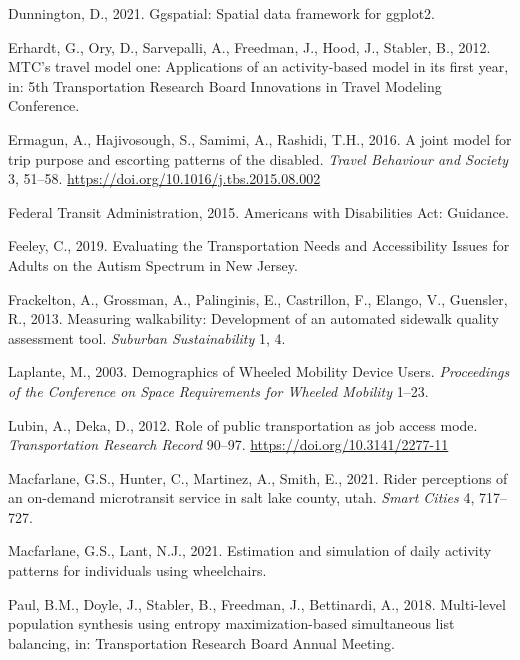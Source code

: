 \documentclass[3p, authoryear, review]{elsarticle} %
\newlength{\cslhangindent}
\newenvironment{CSLReferences}[2] %
 {%
  \setlength{\parindent}{0pt}
  \ifodd #1 \everypar{\setlength{\hangindent}{\cslhangindent}}\ignorespaces\fi
  \ifnum #2 > 0
  \setlength{\parskip}{#2\baselineskip}
  \fi
 }%
 {}
\begin{document}
\begin{CSLReferences}{1}{0}
\leavevmode{}%
Dunnington, D., 2021. Ggspatial: Spatial data framework for ggplot2.

\leavevmode{}%
Erhardt, G., Ory, D., Sarvepalli, A., Freedman, J., Hood, J., Stabler, B., 2012. MTC's travel model one: Applications of an activity-based model in its first year, in: 5th Transportation Research Board Innovations in Travel Modeling Conference.

\leavevmode{}%
Ermagun, A., Hajivosough, S., Samimi, A., Rashidi, T.H., 2016. {A joint model for trip purpose and escorting patterns of the disabled}. \emph{Travel Behaviour and Society} 3, 51--58. \url{https://doi.org/10.1016/j.tbs.2015.08.002}

\leavevmode{}%
Federal Transit Administration, 2015. {Americans with Disabilities Act: Guidance}.

\leavevmode{}%
Feeley, C., 2019. {Evaluating the Transportation Needs and Accessibility Issues for Adults on the Autism Spectrum in New Jersey}.

\leavevmode{}%
Frackelton, A., Grossman, A., Palinginis, E., Castrillon, F., Elango, V., Guensler, R., 2013. Measuring walkability: Development of an automated sidewalk quality assessment tool. \emph{Suburban Sustainability} 1, 4.

\leavevmode{}%
Laplante, M., 2003. {Demographics of Wheeled Mobility Device Users}. \emph{Proceedings of the Conference on Space Requirements for Wheeled Mobility} 1--23.

\leavevmode{}%
Lubin, A., Deka, D., 2012. {Role of public transportation as job access mode}. \emph{Transportation Research Record} 90--97. \url{https://doi.org/10.3141/2277-11}

\leavevmode{}%
Macfarlane, G.S., Hunter, C., Martinez, A., Smith, E., 2021. Rider perceptions of an on-demand microtransit service in salt lake county, utah. \emph{Smart Cities} 4, 717--727.

\leavevmode{}%
Macfarlane, G.S., Lant, N.J., 2021. Estimation and simulation of daily activity patterns for individuals using wheelchairs.

\leavevmode{}%
Paul, B.M., Doyle, J., Stabler, B., Freedman, J., Bettinardi, A., 2018. Multi-level population synthesis using entropy maximization-based simultaneous list balancing, in: Transportation Research Board Annual Meeting.


\end{CSLReferences}
\end{document}
